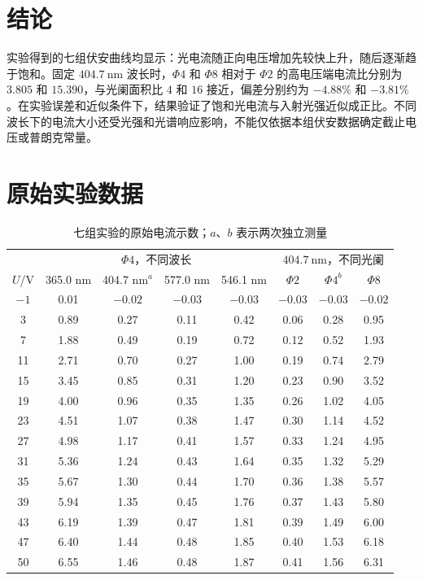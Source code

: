 \documentclass[12pt,a4paper]{ctexart}
\begin{document}
\section{结论}
实验得到的七组伏安曲线均显示：光电流随正向电压增加先较快上升，随后逐渐趋于饱和。固定 $404.7\ \mathrm{nm}$ 波长时，$\Phi4$ 和 $\Phi8$ 相对于 $\Phi2$ 的高电压端电流比分别为 $3.805$ 和 $15.390$，与光阑面积比 $4$ 和 $16$ 接近，偏差分别约为 $-4.88\%$ 和 $-3.81\%$。在实验误差和近似条件下，结果验证了饱和光电流与入射光强近似成正比。不同波长下的电流大小还受光强和光谱响应影响，不能仅依据本组伏安数据确定截止电压或普朗克常量。

\appendix
\section{原始实验数据}
\begin{table}[H]
  \centering
  \caption{七组实验的原始电流示数；$a$、$b$ 表示两次独立测量}
  \label{tab:raw-data}
  \small
  \begin{tabular}{c|cccc|ccc}
    \toprule
    & \multicolumn{4}{c|}{$\Phi4$，不同波长} & \multicolumn{3}{c}{$404.7\ \mathrm{nm}$，不同光阑} \\
    $U$/V & 365.0 nm & 404.7 nm$^a$ & 577.0 nm & 546.1 nm & $\Phi2$ & $\Phi4^b$ & $\Phi8$ \\
    \midrule
    $-1$ & 0.01 & $-0.02$ & $-0.03$ & $-0.03$ & $-0.03$ & $-0.03$ & $-0.02$ \\
    3  & 0.89 & 0.27 & 0.11 & 0.42 & 0.06 & 0.28 & 0.95 \\
    7  & 1.88 & 0.49 & 0.19 & 0.72 & 0.12 & 0.52 & 1.93 \\
    11 & 2.71 & 0.70 & 0.27 & 1.00 & 0.19 & 0.74 & 2.79 \\
    15 & 3.45 & 0.85 & 0.31 & 1.20 & 0.23 & 0.90 & 3.52 \\
    19 & 4.00 & 0.96 & 0.35 & 1.35 & 0.26 & 1.02 & 4.05 \\
    23 & 4.51 & 1.07 & 0.38 & 1.47 & 0.30 & 1.14 & 4.52 \\
    27 & 4.98 & 1.17 & 0.41 & 1.57 & 0.33 & 1.24 & 4.95 \\
    31 & 5.36 & 1.24 & 0.43 & 1.64 & 0.35 & 1.32 & 5.29 \\
    35 & 5.67 & 1.30 & 0.44 & 1.70 & 0.36 & 1.38 & 5.57 \\
    39 & 5.94 & 1.35 & 0.45 & 1.76 & 0.37 & 1.43 & 5.80 \\
    43 & 6.19 & 1.39 & 0.47 & 1.81 & 0.39 & 1.49 & 6.00 \\
    47 & 6.40 & 1.44 & 0.48 & 1.85 & 0.40 & 1.53 & 6.18 \\
    50 & 6.55 & 1.46 & 0.48 & 1.87 & 0.41 & 1.56 & 6.31 \\
    \bottomrule
  \end{tabular}
\end{table}
\end{document}
